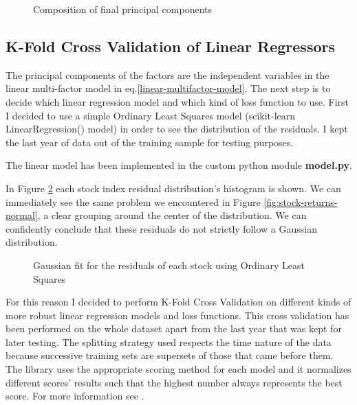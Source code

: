 \begin{figure}[htb]
	\centering
	
	\caption{Composition of final principal components}
	\label{fig:factor-contribution-pca2}
\end{figure}

\subsection{K-Fold Cross Validation of Linear Regressors}
\label{crossval}
The principal components of the factors are the independent variables in the linear multi-factor model in eq.\eqref{linear-multifactor-model}. The next step is to decide which linear regression model and which kind of loss function to use.
First I decided to use a simple Ordinary Least Squares model (scikit-learn LinearRegression() model) in order to see the distribution of the residuals. I kept the last year of data out of the training sample for testing purposes.

The linear model has been implemented in the custom python module \textbf{model.py}.

In Figure \ref{fig:linreg-residuals} each stock index residual distribution's histogram is shown. We can immediately see the same problem we encountered in Figure \ref{fig:stock-returns-normal}, a clear grouping around the center of the distribution. We can confidently conclude that these residuals do not strictly follow a Gaussian distribution.

\begin{figure}[htb]
	\centering
	
	\caption{Gaussian fit for the residuals of each stock using Ordinary Least Squares}
	\label{fig:linreg-residuals}
\end{figure}

For this reason I decided to perform K-Fold Cross Validation on different kinds of more robust linear regression models and loss functions. This cross validation has been performed on the whole dataset apart from the last year that was kept for later testing. The splitting strategy used respects the time nature of the data because successive training sets are supersets of those that came before them.
The library uses the appropriate scoring method for each model and it normalizes different scores' results such that the highest number always represents the best score. For more information see \cite{cross-val-info}.


